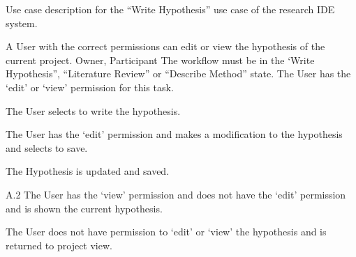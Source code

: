 \documentclass[document.tex]{subfiles}
\begin{document}
\begin{table}
  \centering
  \caption{Use case description for the ``Write Hypothesis'' use case of the research IDE system.}
  \label{tbl:use-case-write-hypothesis}

  \begin{usecase}
    A User with the correct permissions can edit or view the hypothesis of the current project.
    Owner, Participant
    The workflow must be in the ‘Write Hypothesis”, “Literature Review” or “Describe Method” state. The User has the ‘edit’ or ‘view’ permission for this task.
    \ucnormal
    \begin{ucenum}
      \item The User selects to write the hypothesis.
      \item The User has the ‘edit’ permission and makes a modification to the hypothesis and selects to save.
      \item The Hypothesis is updated and saved.
    \end{ucenum}
    \begin{ucenum}
      \item [A.2] The User has the ‘view’ permission and does not have the ‘edit’ permission and is shown the current hypothesis.
    \end{ucenum}
    The User does not have permission to ‘edit’ or ‘view’ the hypothesis and is returned to project view.
  \end{usecase}
\end{table}
\end{document}
